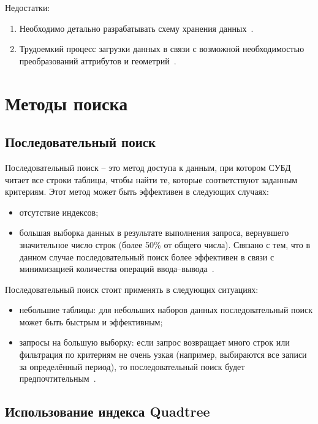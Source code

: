 Недостатки:
\begin{enumerate}
    \item Необходимо детально разрабатывать схему хранения данных~\cite{rdbms-spatial-extensions}.
    \item Трудоемкий процесс загрузки данных в связи с возможной необходимостью преобразований аттрибутов и геометрий~\cite{rdbms-spatial-extensions}.
\end{enumerate}

\section{Методы поиска}

\subsection{Последовательный поиск}

Последовательный поиск -- это метод доступа к данным, при котором СУБД читает все строки таблицы, чтобы найти те, которые соответствуют заданным критериям.
Этот метод может быть эффективен в следующих случаях:
\begin{itemize}
    \item отсутствие индексов;
    \item большая выборка данных в результате выполнения запроса, вернувшего значительное число строк (более 50\% от общего числа). Связано с тем, что в данном случае последовательный поиск более эффективен в связи с минимизацией количества операций ввода--вывода~\cite{sequence-scan}.
\end{itemize}

Последовательный поиск стоит применять в следующих ситуациях:
\begin{itemize}
    \item небольшие таблицы: для небольших наборов данных последовательный поиск может быть быстрым и эффективным;
    \item запросы на большую выборку: если запрос возвращает много строк или фильтрация по критериям не очень узкая (например, выбираются все записи за определённый период), то последовательный поиск будет предпочтительным~\cite{sequence-scan}.
\end{itemize}

\subsection{Использование индекса Quadtree}

